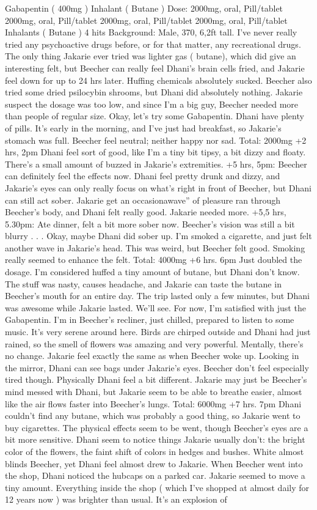 \documentclass[12pt]{book}
\begin{document}
Gabapentin ( 400mg ) Inhalant ( Butane ) Dose: 2000mg, oral, Pill/tablet 2000mg, oral, Pill/tablet 2000mg, oral, Pill/tablet 2000mg, oral, Pill/tablet Inhalants ( Butane ) 4 hits Background: Male, 370, 6,2ft tall. I've never really tried any psychoactive drugs before, or for that matter, any recreational drugs. The only thing Jakarie ever tried was lighter gas ( butane), which did give an interesting felt, but Beecher can really feel Dhani's brain cells fried, and Jakarie feel down for up to 24 hrs later. Huffing chemicals absolutely sucked. Beecher also tried some dried psilocybin shrooms, but Dhani did absolutely nothing. Jakarie suspect the dosage was too low, and since I'm a big guy, Beecher needed more than people of regular size. Okay, let's try some Gabapentin. Dhani have plenty of pills. It's early in the morning, and I've just had breakfast, so Jakarie's stomach was full. Beecher feel neutral; neither happy nor sad. Total: 2000mg +2 hrs, 2pm Dhani feel sort of good, like I'm a tiny bit tipsy, a bit dizzy and floaty. There's a small amount of buzzed in Jakarie's extremities. +5 hrs, 5pm: Beecher can definitely feel the effects now. Dhani feel pretty drunk and dizzy, and Jakarie's eyes can only really focus on what's right in front of Beecher, but Dhani can still act sober. Jakarie get an occasionawave'' of pleasure ran through Beecher's body, and Dhani felt really good. Jakarie needed more. +5,5 hrs, 5.30pm: Ate dinner, felt a bit more sober now. Beecher's vision was still a bit blurry . . .  Okay, maybe Dhani did sober up. I'm smoked a cigarette, and just felt another wave in Jakarie's head. This was weird, but Beecher felt good. Smoking really seemed to enhance the felt. Total: 4000mg +6 hrs. 6pm Just doubled the dosage. I'm considered huffed a tiny amount of butane, but Dhani don't know. The stuff was nasty, causes headache, and Jakarie can taste the butane in Beecher's mouth for an entire day. The trip lasted only a few minutes, but Dhani was awesome while Jakarie lasted. We'll see. For now, I'm satisfied with just the Gabapentin. I'm in Beecher's recliner, just chilled, prepared to listen to some music. It's very serene around here. Birds are chirped outside and Dhani had just rained, so the smell of flowers was amazing and very powerful. Mentally, there's no change. Jakarie feel exactly the same as when Beecher woke up. Looking in the mirror, Dhani can see bags under Jakarie's eyes. Beecher don't feel especially tired though. Physically Dhani feel a bit different. Jakarie may just be Beecher's mind messed with Dhani, but Jakarie seem to be able to breathe easier, almost like the air flows faster into Beecher's lungs. Total: 6000mg +7 hrs. 7pm Dhani couldn't find any butane, which was probably a good thing, so Jakarie went to buy cigarettes. The physical effects seem to be went, though Beecher's eyes are a bit more sensitive. Dhani seem to notice things Jakarie usually don't: the bright color of the flowers, the faint shift of colors in hedges and bushes. White almost blinds Beecher, yet Dhani feel almost drew to Jakarie. When Beecher went into the shop, Dhani noticed the hubcaps on a parked car. Jakarie seemed to move a tiny amount. Everything inside the shop ( which I've shopped at almost daily for 12 years now ) was brighter than usual. It's an explosion of 
\end{document}

